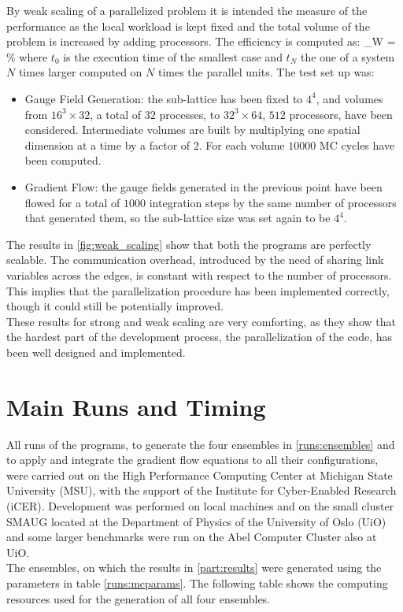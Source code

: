 By weak scaling of a parallelized problem it is intended the measure of the performance as the local workload is kept fixed and the total volume of the problem is increased by adding processors. The efficiency is computed as:
\beq
\eta_W = \% 
\eeq 
where $t_0$ is the execution time of the smallest case and $t_N$ the one of a system $N$ times larger computed on $N$ times the parallel units. The test set up was:
\begin{itemize}
    \item Gauge Field Generation: the sub-lattice has been fixed to $4^4$, and volumes from $16^3\times32$, a total of $32$ processes, to $32^3\times64$, $512$ processors, have been considered. Intermediate volumes are built by multiplying one spatial dimension at a time by a factor of 2. For each volume $10000$ MC cycles have been computed.
    \item Gradient Flow: the gauge fields generated in the previous point have been flowed for a total of $1000$ integration steps by the same number of processors that generated them, so the sub-lattice size was set again to be $4^4$.
\end{itemize}


The results in \cref{fig:weak_scaling} show that both the programs are perfectly scalable. The communication overhead, introduced by the need of sharing link variables across the edges, is constant with respect to the number of processors. This implies that the parallelization procedure has been implemented correctly, though it could still be potentially improved. \\
These results for strong and weak scaling are very comforting, as they show that the hardest part of the development process, the parallelization of the code, has been well designed and implemented.


\section{Main Runs and Timing}
All runs of the programs, to generate the four ensembles in \cref{runs:ensembles} and to apply and integrate the gradient flow equations to all their configurations, were carried out on the High Performance Computing Center at Michigan State University (MSU), with the support of the Institute for Cyber-Enabled Research (iCER). Development was performed on local machines and on the small cluster SMAUG located at the Department of Physics of the University of Oslo (UiO) and some larger benchmarks were run on the Abel Computer Cluster also at UiO.\\
The ensembles, on which the results in \cref{part:results} were generated using the parameters in table \cref{runs:mcparams}. The following table shows the computing resources used for the generation of all four ensembles. 


